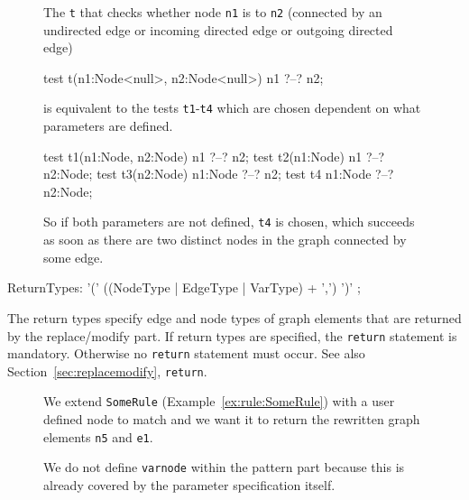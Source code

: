 \begin{figure}[htbp]
\begin{example}
The  \texttt{t} that checks whether node \texttt{n1} is  to \texttt{n2} (connected by an undirected edge or incoming directed edge or outgoing directed edge)
\begin{grgen}
test t(n1:Node<null>, n2:Node<null>) {
  n1 ?--? n2;
}
\end{grgen}
is equivalent to the tests \texttt{t1}-\texttt{t4} which are chosen dependent on what parameters are defined.
\begin{grgen}
test t1(n1:Node, n2:Node) {
  n1 ?--? n2;
}
test t2(n1:Node) {
  n1 ?--? n2:Node;
}
test t3(n2:Node) {
  n1:Node ?--? n2;
}
test t4 {
  n1:Node ?--? n2:Node;
}
\end{grgen}
So if both parameters are not defined, \texttt{t4} is chosen, which succeeds as soon as there are two distinct nodes in the graph connected by some edge.
\end{example}
\end{figure}

\begin{rail}
  ReturnTypes: '(' ((NodeType | EdgeType | VarType) + ',') ')' ;
\end{rail}
The return types specify edge and node types of graph elements that are returned by the replace/modify part.
If return types are specified, the \texttt{return} statement is mandatory.
Otherwise no \texttt{return} statement must occur. See also Section~\ref{sec:replacemodify}, \texttt{return}.

\begin{figure}[htbp]
\begin{example}\label{ex:rule:someruleext}
We extend \texttt{SomeRule} (Example~\ref{ex:rule:SomeRule}) with a user defined node to match and we want it to return the rewritten graph elements \texttt{n5} and \texttt{e1}.
\begin{grgen}
  rule SomeRuleExt(varnode:Node):(Node, EdgeTypeB) {
    n1:NodeTypeA;
    ...

    replace {
      varnode;
      ...
      return(n5, e1);
      eval {
        ...
\end{grgen}
We do not define \texttt{varnode} within the pattern part because this is already covered by the parameter specification itself.
\end{example}
\end{figure}


